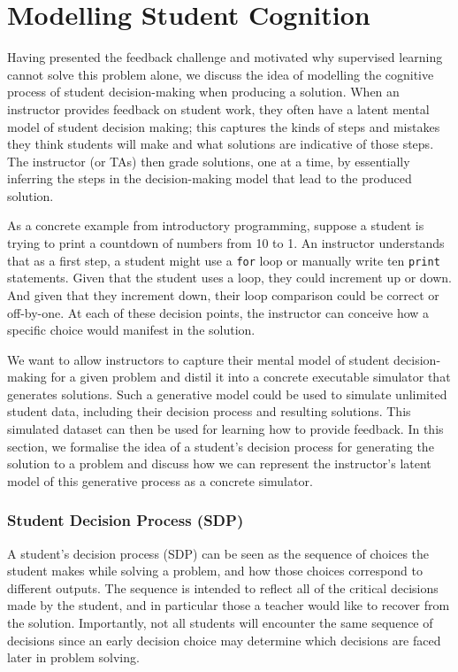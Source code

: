 \section{Modelling Student Cognition}
\label{sec:generative_model}

Having presented the feedback challenge and motivated why supervised learning cannot solve this problem alone, we discuss the idea of modelling the cognitive process of student decision-making when producing a solution.
When an instructor provides feedback on student work, they often have a latent mental model of student decision making; this captures the kinds of steps and mistakes they think students will make and what solutions are indicative of those steps. The instructor (or TAs) then grade solutions, one at a time, by essentially inferring the steps in the decision-making model that lead to the produced solution. 

As a concrete example from introductory programming, suppose a student is trying to print a countdown of numbers from 10 to 1. An instructor understands that as a first step, a student might use a \texttt{for} loop or manually write ten \texttt{print} statements. Given that the student uses a loop, they could increment up or down. And given that they increment down, their loop comparison could be correct or off-by-one.  At each of these decision points, the instructor can conceive how a specific choice would manifest in the solution.

We want to allow instructors to capture their mental model of student  decision-making for a given problem and distil it into a concrete executable simulator that generates solutions. Such a generative model could be used to simulate unlimited student data, including their decision process and resulting solutions. This simulated dataset can then be used for learning how to provide feedback.
In this section, we formalise the idea of a student's  decision process for generating the solution to a problem and discuss how we can represent the instructor's latent model of this generative process as a concrete simulator.

\subsubsection{Student Decision Process (SDP)} 
A student's decision process (SDP) can be seen as the sequence of choices the student makes while solving a problem, and how those choices correspond to different outputs.  The sequence is intended to reflect all of the critical decisions made by the student, and in particular those a teacher would like to recover from the solution. Importantly, not all students will encounter the same sequence of decisions since an early decision choice may determine which decisions are faced later in problem solving. 


